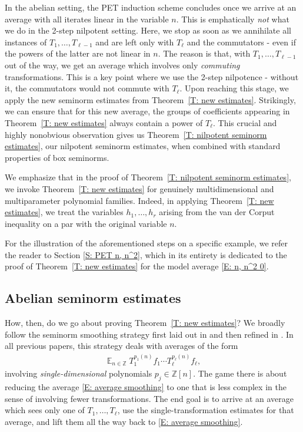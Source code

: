 \documentclass[11pt]{amsart}
\theoremstyle{definition}
\DeclareMathOperator*{\E}{\mathbb{E}}
\newcommand{\Z}{{\mathbb Z}}
\newcommand{\1}{{\mathbf{1}}}
\begin{document}
In the abelian setting, the PET induction scheme concludes once we arrive at an average with all iterates linear in the variable $n$. This is emphatically \textit{not} what we do in the 2-step nilpotent setting. Here, we stop as soon as we annihilate all instances of $T_1, \ldots, T_{\ell-1}$ and are left only with $T_\ell$ and the commutators - even if the powers of the latter are not linear in $n$. The reason is that, with $T_1, \ldots, T_{\ell-1}$ out of the way, we get an average which involves only \textit{commuting} transformations. This is a key point where we use the 2-step nilpotence - without it, the commutators would not commute with $T_\ell$. Upon reaching this stage, we apply the new seminorm estimates from Theorem~\ref{T: new estimates}. Strikingly, we can ensure that for this new average, the groups of coefficients appearing in Theorem~\ref{T: new estimates} always contain a power of $T_\ell$. This crucial and highly nonobvious observation gives us Theorem~\ref{T: nilpotent seminorm estimates}, our nilpotent seminorm estimates, when combined with standard properties of box seminorms.

{We emphasize that in the proof of Theorem~\ref{T: nilpotent seminorm estimates}, we invoke Theorem~\ref{T: new estimates} for genuinely multidimensional and multiparameter polynomial families. Indeed, in applying Theorem~\ref{T: new estimates}, we treat the variables $h_1, \ldots, h_r$ arising from the van der Corput inequality on a par with the original variable $n$.}

For the illustration of the aforementioned steps on a specific example, we refer the reader to Section \ref{S: PET n, n^2}, which in its entirety is dedicated to the proof of Theorem~\ref{T: new estimates} for the model average \eqref{E: n, n^2 0}.

\subsection{Abelian seminorm estimates}
How, then, do we go about proving Theorem~\ref{T: new estimates}? We broadly follow the seminorm smoothing strategy first laid out in \cite{FrKu22a} and then refined in \cite{DKKST25, DKKST24, FrKu22b, Kuc23}. In all previous papers, this strategy deals with averages of the form
\begin{align}\label{E: average smoothing}
    \E_{n\in\Z}T_1^{p_1(n)}f_1\cdots T_\ell^{p_\ell(n)}f_\ell,
\end{align}
involving \textit{single-dimensional} polynomials $p_j\in \Z[n]$. The game there is about reducing the average \eqref{E: average smoothing} to one that is less complex in the sense of involving fewer transformations. The end goal is to arrive at an average which sees only one of $T_1, \ldots, T_\ell$, use the single-transformation estimates for that average, and lift them all the way back to \eqref{E: average smoothing}. 
\end{document}
